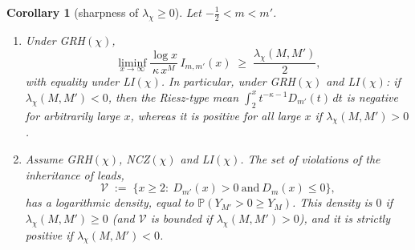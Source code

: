 \documentclass[11pt]{amsart}
\newtheorem{corollary}[theorem]{Corollary}
\theoremstyle{definition}
\numberwithin{equation}{section}
\newcommand{\PP}{\mathbb P}
\begin{document}
\begin{corollary}[sharpness of $\lambda_\chi\ge0$]\label{cor:sharp}
Let $-\tfrac12<m<m'$.
\begin{enumerate}
\item[(a)] Under GRH$(\chi)$,
\[
\liminf_{x\to\infty}\frac{\log x}{\kappa\,x^M}\,I_{m,m'}(x)\;\ge\;
\frac{\lambda_\chi(M,M')}{2},
\]
with equality under LI$(\chi)$. In particular, under GRH$(\chi)$ and
LI$(\chi)$: if $\lambda_\chi(M,M')<0$, then the Riesz-type mean
$\int_2^xt^{-\kappa-1}D_{m'}(t)\,dt$ is negative for arbitrarily
large $x$, whereas it is positive for all large $x$ if
$\lambda_\chi(M,M')>0$.
\item[(b)] Assume GRH$(\chi)$, NCZ$(\chi)$ and LI$(\chi)$. The set of
violations of the inheritance of leads,
\[
\mathcal V\;:=\;\{x\ge2:\ D_{m'}(x)>0\ \text{and}\ D_m(x)\le0\},
\]
has a logarithmic density, equal to $\PP(Y_{M'}>0\ge Y_M)$. This
density is $0$ if $\lambda_\chi(M,M')\ge0$ (and $\mathcal V$ is
bounded if $\lambda_\chi(M,M')>0$), and it is strictly positive if
$\lambda_\chi(M,M')<0$.
\end{enumerate}
\end{corollary}
\end{document}
